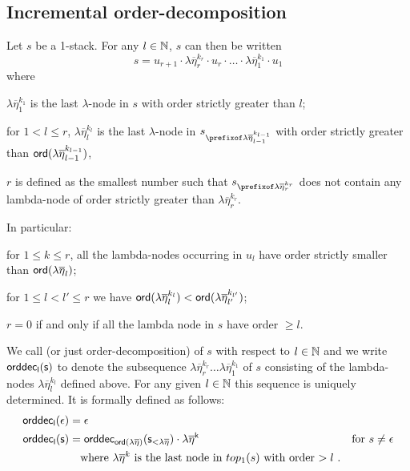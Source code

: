 \documentclass{article}
\theoremstyle{remark}
\theoremstyle{definition}
\newcommand\orddec{\sf orddec}
\begin{document}
\subsection{Incremental order-decomposition}

Let $s$ be a 1-stack. For any $l\in \mathbb{N}$, $s$ can then be written
$$ s = u_{r+1} \cdot \lambda \overline{\eta}_r^{k_r} \cdot u_r \cdot
\ldots \cdot \lambda \overline{\eta}_1^{k_1} \cdot  u_1 $$
where
\begin{compactitem}
\item  $\lambda \overline{\eta}_1^{k_1}$ is the
last $\lambda$-node in $s$ with order strictly greater than $l$;

\item for $1 < l \leq r$, $\lambda
\overline{\eta}_l^{k_l}$ is the last $\lambda$-node in $s_{\prefixof
\lambda \overline{\eta}_{l-1}^{k_{l-1}}}$ with order strictly
greater than ${\sf ord}(\lambda \overline{\eta}_{l-1}^{k_{l-1}})$,

\item  $r$ is defined as the smallest number such that
$s_{\prefixof \lambda \overline{\eta}_{r}^{k_{r}}}$ does not contain
any lambda-node of order strictly greater than $\lambda
\overline{\eta}_{r}^{k_{r}}$.
\end{compactitem}

\noindent In particular:
\begin{compactitem}
\item for $1 \leq k \leq r$, all the lambda-nodes occurring in $u_l$ have order
strictly smaller than ${\sf ord}(\lambda \overline{\eta}_l)$;
\item for $1\leq l<l'\leq r$ we have ${\sf ord}(\lambda \overline{\eta}_l^{k_l})
< {\sf ord}(\lambda \overline{\eta}_{l'}^{k_{l'}})$;
\item $r=0$ if and only if all the lambda node in $s$ have order $\geq l$.
\end{compactitem}
\smallskip

We call  (or just
order-decomposition) of $s$ with respect to $l\in \mathbb{N}$ and we write $\orddec_l(s)$ to denote the
subsequence $\lambda \overline{\eta}_r^{k_r} \ldots \lambda\overline{\eta}_1^{k_1}$ of $s$ consisting of the lambda-nodes $\lambda
\overline{\eta}_l^{k_l}$ defined above. For any given $l\in \mathbb{N}$ this sequence is uniquely determined. It is formally defined as follows:
\begin{align*}
  \orddec_l(\epsilon) &= \epsilon \\
    \orddec_l(s) &=     \orddec_{\ord{\lambda\overline{\eta}}}(s_{<\lambda\overline{\eta}}) \cdot \lambda\overline{\eta}^k
&    \mbox{for } s\neq\epsilon \\
& \mbox{\quad where } \lambda\overline{\eta}^k \mbox{ is the last node in $top_1(s)$ with order $>l$\ .}
\end{align*}
\end{document}
